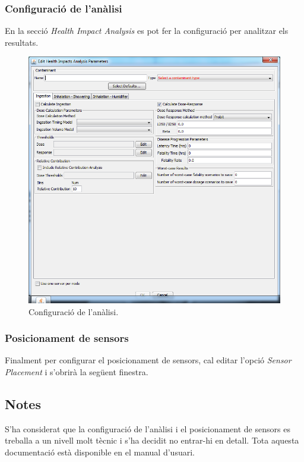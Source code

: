 \documentclass[12pt]{article}
\begin{document}
\subsubsection{Configuració de l'anàlisi}
En la secció \textit{Health Impact Analysis} es pot fer la configuració per analitzar els resultats.
\begin{figure}[h!]
	\centering
	\includegraphics[scale=.4]{imatges/teva-spot/9.png}
	\caption{Configuració de l'anàlisi.}
\end{figure}

\subsubsection{Posicionament de sensors}
Finalment per configurar el posicionament de sensors, cal editar l'opció \textit{Sensor Placement} i s'obrirà la següent finestra.

\clearpage
\subsection{Notes}
S'ha considerat que la configuració de l'anàlisi i el posicionament de sensors es treballa a un nivell molt tècnic i s'ha decidit no entrar-hi en detall. Tota aquesta documentació està disponible en el manual d'usuari. \cite{tevaSpotGui}

\clearpage
\end{document}
